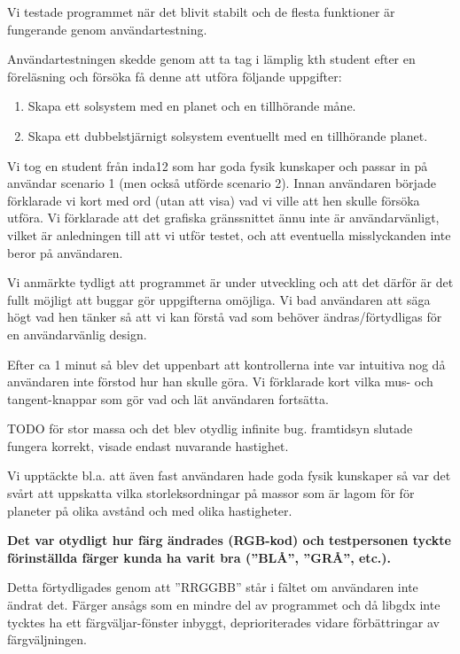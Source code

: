 Vi testade programmet när det blivit stabilt och de flesta funktioner
är fungerande genom användartestning.

Användartestningen skedde genom att ta tag i lämplig kth student efter
en föreläsning och försöka få denne att utföra följande uppgifter:
\begin{enumerate}
    \item Skapa ett solsystem med en planet och en tillhörande måne.
    \item Skapa ett dubbelstjärnigt solsystem eventuellt med
        en tillhörande planet.
\end{enumerate}

Vi tog en student från inda12 som har goda fysik kunskaper
och passar in på användar scenario 1 (men också utförde scenario 2).
Innan användaren började förklarade vi kort med ord (utan att visa)
vad vi ville att hen skulle försöka utföra.
Vi förklarade att det grafiska gränssnittet ännu inte är användarvänligt,
vilket är anledningen till att vi utför testet, och att eventuella
misslyckanden inte beror på användaren.

Vi anmärkte tydligt att programmet är under utveckling och
att det därför är det fullt möjligt att buggar gör uppgifterna omöjliga.
Vi bad användaren att säga högt vad hen tänker så att vi kan förstå vad som
behöver ändras/förtydligas för en användarvänlig design.

Efter ca 1 minut så blev det uppenbart att kontrollerna inte var
intuitiva nog då användaren inte förstod hur han skulle göra.
Vi förklarade kort vilka mus- och tangent-knappar som gör vad och
lät användaren fortsätta.

TODO
för stor massa och det blev otydlig infinite bug.
framtidsyn slutade fungera korrekt, visade endast nuvarande hastighet.

Vi upptäckte bl.a. att även fast användaren hade goda fysik kunskaper så
var det svårt att uppskatta vilka storleksordningar på massor som är
lagom för för planeter på olika avstånd och med olika hastigheter.




\vspace{6pt}

\textbf{Det var otydligt hur färg ändrades (RGB-kod) och testpersonen
tyckte förinställda färger kunda ha varit bra (''BLÅ'', ''GRÅ'', etc.).}

Detta förtydligades genom att ''RRGGBB'' står i fältet om användaren inte
ändrat det. Färger ansågs som en mindre del av programmet och
då libgdx inte tycktes ha ett färgväljar-fönster inbyggt, deprioriterades
vidare förbättringar av färgväljningen.

